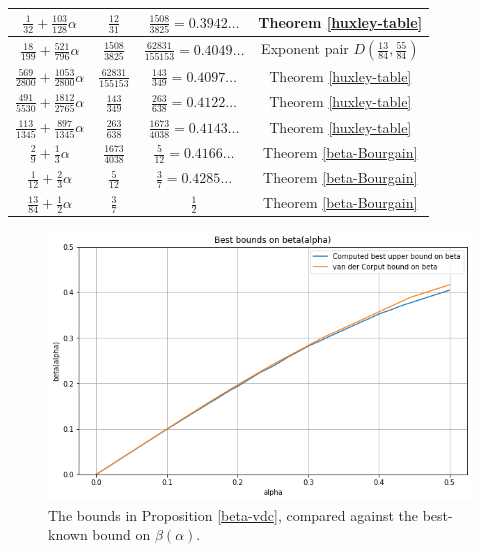 \begin{table}[ht]
\begin{tabular}{|c|c|c|c|}
    \hline
    $ \frac{1}{32} + \frac{103}{128} \alpha $ & $ \frac{12}{31} $ & $ \frac{1508}{3825} = 0.3942\ldots $ & Theorem \ref{huxley-table}\\
    \hline
    $ \frac{18}{199} + \frac{521}{796} \alpha $ & $ \frac{1508}{3825} $ & $ \frac{62831}{155153} = 0.4049\ldots $ & Exponent pair $D(\frac{13}{84}, \frac{55}{84})$\\
    \hline
    $ \frac{569}{2800} + \frac{1053}{2800} \alpha $ & $ \frac{62831}{155153} $ & $ \frac{143}{349} = 0.4097\ldots $ & Theorem \ref{huxley-table}\\
    \hline
    $ \frac{491}{5530} + \frac{1812}{2765} \alpha $ & $ \frac{143}{349} $ & $ \frac{263}{638} = 0.4122\ldots $ & Theorem \ref{huxley-table}\\
    \hline
    $ \frac{113}{1345} + \frac{897}{1345} \alpha $ & $ \frac{263}{638} $ & $ \frac{1673}{4038} = 0.4143\ldots $ &Theorem \ref{huxley-table}\\
    \hline
    $ \frac{2}{9} + \frac{1}{3} \alpha $ & $ \frac{1673}{4038} $ & $ \frac{5}{12} = 0.4166\ldots $ & Theorem \ref{beta-Bourgain}\\
    \hline
    $ \frac{1}{12} + \frac{2}{3} \alpha $ & $ \frac{5}{12} $ & $ \frac{3}{7} = 0.4285\ldots $ & Theorem \ref{beta-Bourgain}\\
    \hline
    $ \frac{13}{84} + \frac{1}{2} \alpha $ & $ \frac{3}{7} $ & $ \frac{1}{2}$ & Theorem \ref{beta-Bourgain}\\
    \hline
    \end{tabular}
    \label{huxley_table_ranges}
    \end{table}

\literature
{}


\begin{figure}
    \centering
    \includegraphics[width=0.5\linewidth]{chapter/van_der_corput_vs_best_beta.png}
    \caption{The bounds in Proposition \ref{beta-vdc}, compared against the best-known bound on $\beta(\alpha)$.}
    \label{fig:vdcb}
\end{figure}
